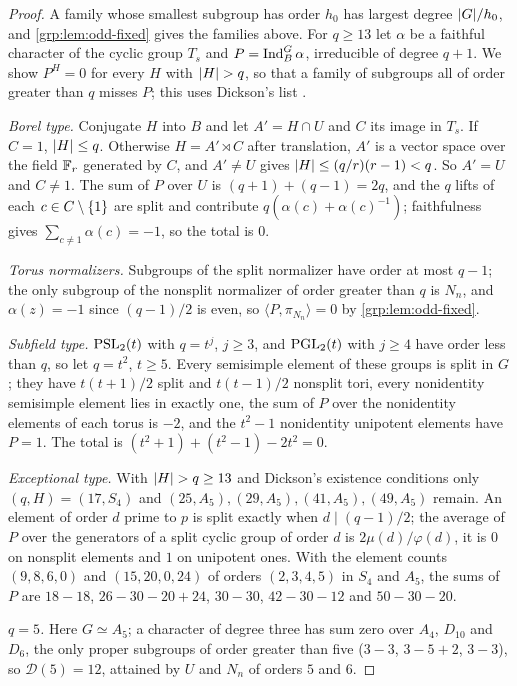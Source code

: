 \begin{proof}
A family whose smallest subgroup has order $h_0$ has largest degree $\lvert G\rvert/h_0$, and
\cref{grp:lem:odd-fixed} gives the families above. For $q\ge13$ let $\alpha$ be a faithful
character of the cyclic group $T_s$ and $P=\operatorname{Ind}_B^G\alpha$, irreducible of degree $q+1$. We show
$P^H=0$ for every $H$ with $\lvert H\rvert>q$, so that a family of subgroups all of order greater than
$q$ misses $P$; this uses Dickson's list \cite[Theorem~A.1]{GuralnickZieve2010Polynomials}.

\emph{Borel type.} Conjugate $H$ into $B$ and let $A'=H\cap U$ and $C$ its image in $T_s$. If
$C=1$, $\lvert H\rvert\le q$. Otherwise $H=A'\rtimes C$ after translation, $A'$ is a vector space over the
field $\mathbb{F}_r$ generated by $C$, and $A'\ne U$ gives $\lvert H\rvert\le(q/r)(r-1)<q$. So $A'=U$ and $C\ne1$.
The sum of $P$ over $U$ is $(q+1)+(q-1)=2q$, and the $q$ lifts of each $c\in C\setminus\{1\}$ are
split and contribute $q(\alpha(c)+\alpha(c)^{-1})$; faithfulness gives
$\sum_{c\ne1}\alpha(c)=-1$, so the total is $0$.

\emph{Torus normalizers.} Subgroups of the split normalizer have order at most $q-1$; the only
subgroup of the nonsplit normalizer of order greater than $q$ is $N_n$, and $\alpha(z)=-1$ since
$(q-1)/2$ is even, so $\langle P,\pi_{N_n}\rangle=0$ by \cref{grp:lem:odd-fixed}.

\emph{Subfield type.} $\operatorname{PSL}_2(t)$ with $q=t^j$, $j\ge3$, and $\operatorname{PGL}_2(t)$ with $j\ge4$ have order
less than $q$, so let $q=t^2$, $t\ge5$. Every semisimple element of these groups is split in
$G$; they have $t(t+1)/2$ split and $t(t-1)/2$ nonsplit tori, every nonidentity semisimple
element lies in exactly one, the sum of $P$ over the nonidentity elements of each torus is
$-2$, and the $t^2-1$ nonidentity unipotent elements have $P=1$. The total is
$(t^2+1)+(t^2-1)-2t^2=0$.

\emph{Exceptional type.} With $\lvert H\rvert>q\ge13$ and Dickson's existence conditions only
$(q,H)=(17,S_4)$ and $(25,A_5),(29,A_5),(41,A_5),(49,A_5)$ remain. An element of order $d$
prime to $p$ is split exactly when $d\mid(q-1)/2$; the average of $P$ over the generators of a
split cyclic group of order $d$ is $2\mu(d)/\varphi(d)$, it is $0$ on nonsplit elements and $1$ on
unipotent ones. With the element counts $(9,8,6,0)$ and $(15,20,0,24)$ of orders $(2,3,4,5)$ in
$S_4$ and $A_5$, the sums of $P$ are $18-18$, $26-30-20+24$, $30-30$, $42-30-12$ and $50-30-20$.

\emph{$q=5$.} Here $G\simeq A_5$; a character of degree three has sum zero over $A_4$, $D_{10}$ and
$D_6$, the only proper subgroups of order greater than five ($3-3$, $3-5+2$, $3-3$), so
$\mathcal D(5)=12$, attained by $U$ and $N_n$ of orders $5$ and $6$.


\end{proof}
